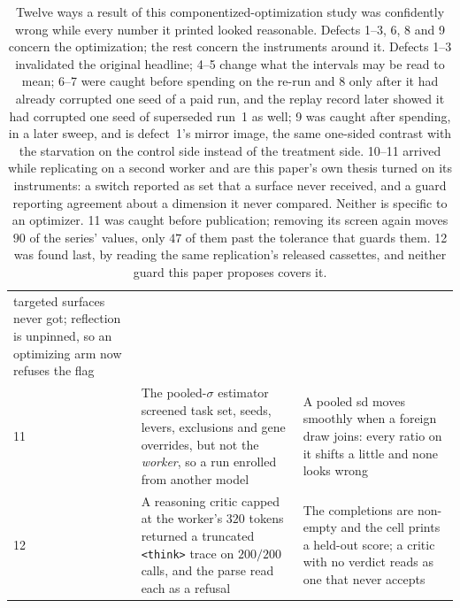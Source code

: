\documentclass[11pt]{article}
\begin{document}
\begin{table}[h]
\begin{tabular}{p{}p{}p{}}
  targeted surfaces never got; reflection is unpinned, so an optimizing arm now refuses the flag \\
11 & The pooled-$\sigma$ estimator screened task set, seeds, levers, exclusions and gene
  overrides, but not the \emph{worker}, so a run enrolled from another model & A pooled sd moves
  smoothly when a foreign draw joins: every ratio on it shifts a little and none looks wrong \\
12 & A reasoning critic capped at the worker's $320$ tokens returned a truncated \texttt{<think>}
  trace on $200/200$ calls, and the parse read each as a refusal & The completions are non-empty
  and the cell prints a held-out score; a critic with no verdict reads as one that never accepts \\
\bottomrule
\end{tabular}
\caption{Twelve ways a result of this componentized-optimization study was confidently wrong
while every number it printed looked reasonable. Defects 1--3, 6, 8 and 9 concern the
optimization; the rest concern the instruments around it. Defects 1--3 invalidated the original headline; 4--5 change
what the intervals may be read to mean; 6--7 were caught before spending on the re-run and 8
only after it had already corrupted one seed of a paid run, and the replay record later showed it
had corrupted one seed of superseded run~1 as well; 9 was caught after spending, in a later
sweep, and is defect~1's mirror image, the same one-sided contrast with the starvation on the
control side instead of the treatment side. 10--11 arrived while replicating on a second worker
and are this paper's own thesis turned on its instruments: a switch reported as set that a
surface never received, and a guard reporting agreement about a dimension it never compared.
Neither is specific to an optimizer. 11 was caught before publication; removing its screen again moves $90$ of the series' values, only $47$ of them past the tolerance that guards them.
12 was found last, by reading the same replication's released cassettes, and neither guard this
paper proposes covers it.}
\label{tab:defects}
\end{table}
\end{document}
